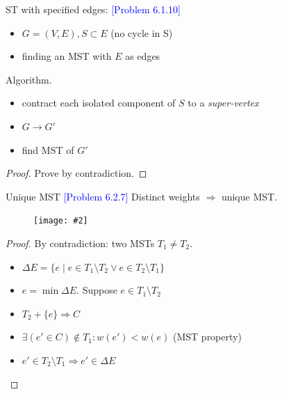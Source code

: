 \documentclass{beamer}
\newcommand{\set}[1]{\{ #1 \}}
\newcommand{\problemno}[1]{\textcolor{blue}{\scriptsize [Problem #1]}}
\newcommand{\fignocaption}[2]
{
  \begin{figure}[htp]
    \centering
      \texttt{[image: \#2]}
  \end{figure}
}
\begin{document}
\begin{frame}{}
  \begin{block}{ST with specified edges: \problemno{6.1.10}}
    \begin{itemize}
      \item $G = (V,E), S \subset E$ (no cycle in S)
      \item finding an MST with $E$ as edges
    \end{itemize}
  \end{block}

  \begin{block}{Algorithm.}
    \begin{itemize}
      \item contract each isolated component of $S$ to a \emph{super-vertex}
      \item $G \to G'$
      \item find MST of $G'$
    \end{itemize}
  \end{block}

  \begin{proof}
    Prove by contradiction.
  \end{proof}
\end{frame}
\begin{frame}{}
  \begin{block}{Unique MST \problemno{6.2.7}}
    Distinct weights $\Rightarrow$ unique MST.
  \end{block}

  \fignocaption{width = 0.35\textwidth}{fig/mst-unique.pdf}

  \begin{proof}
	By contradiction: two MSTs $T_1 \neq T_2$.
	\begin{itemize}
	  \item $\Delta E = \set{e \mid e \in T_1 \setminus T_2 \lor e \in T_2
	  \setminus T_1}$
	  \item $e = \min \Delta E$. Suppose $e \in T_1 \setminus T_2$
	  \item $T_2 + \set{e} \Rightarrow C$
	  \item $\exists (e' \in C) \notin T_1: w(e') < w(e)$ (MST property)
	  \item $e' \in T_2 \setminus T_1 \Rightarrow e' \in \Delta E$
	\end{itemize}
  \end{proof}
\end{frame}
\end{document}
